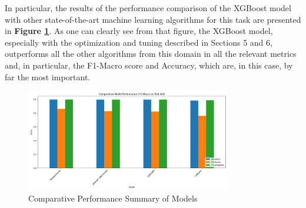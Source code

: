 In particular, the results of the performance comparison of the XGBoost model with other state-of-the-art machine learning algorithms for this task are presented in \textbf{Figure \ref{fig:comparative_performance_summary}}. As one can clearly see from that figure, the XGBoost model, especially with the optimization and tuning described in Sections 5 and 6, outperforms all the other algorithms from this domain in all the relevant metrics and, in particular, the F1-Macro score and Accuracy, which are, in this case, by far the most important.

\begin{figure}[H]
	\centering
	\includegraphics[width=0.8\textwidth]{assets/figures/results/comparative_performance_summary.png}
	\caption{Comparative Performance Summary of Models}
	\label{fig:comparative_performance_summary}
\end{figure}
